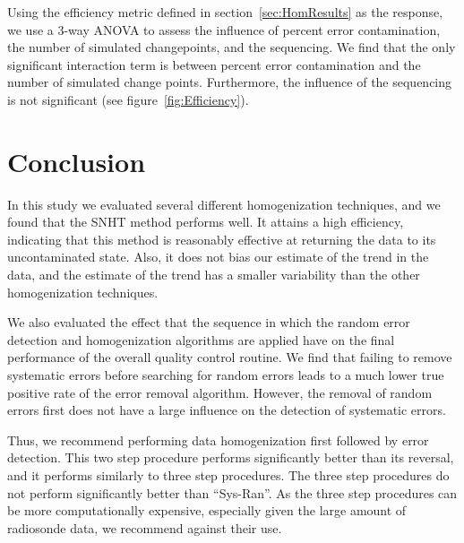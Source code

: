 \documentclass[12pt]{article}
\begin{document}
\begin{doublespacing}
Using the efficiency metric defined in section~\ref{sec:HomResults} as the response, we use a 3-way ANOVA to assess the influence of percent error contamination, the number of simulated changepoints, and the sequencing.  We find that the only significant interaction term is between percent error contamination and the number of simulated change points.  Furthermore, the influence of the sequencing is not significant (see figure~\ref{fig:Efficiency}).

\section{Conclusion}

In this study we evaluated several different homogenization techniques, and we found that the SNHT method performs well.  It attains a high efficiency, indicating that this method is reasonably effective at returning the data to its uncontaminated state.  Also, it does not bias our estimate of the trend in the data, and the estimate of the trend has a smaller variability than the other homogenization techniques.

We also evaluated the effect that the sequence in which the random error detection and homogenization algorithms are applied have on the final performance of the overall quality control routine.  We find that failing to remove systematic errors before searching for random errors leads to a much lower true positive rate of the error removal algorithm.  However, the removal of random errors first does not have a large influence on the detection of systematic errors.

Thus, we recommend performing data homogenization first followed by error detection.  This two step procedure performs significantly better than its reversal, and it performs similarly to three step procedures.  The three step procedures do not perform significantly better than ``Sys-Ran''.  As the three step procedures can be more computationally expensive, especially given the large amount of radiosonde data, we recommend against their use.

\clearpage


\end{doublespacing}
\end{document}
